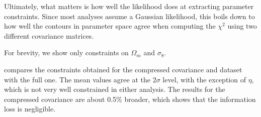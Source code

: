 \documentclass[twocolumn]{\docclass}
\begin{document}
	Ultimately, what matters is how well the likelihood does at extracting parameter constraints. Since most analyses assume a Gaussian likelihood, this boils down to how well the contours in parameter space agree when computing the $\chi^2$ using two different covariance matrices.
	
	For brevity, we show only constraints on $\Omega_m$ and $\sigma_8$.
	
	
	
	
	
		
	
	
	
	
	 compares the constraints obtained for the compressed covariance and dataset with the full one. The mean values agree at the $2 \sigma$ level, with the exception of $\eta$, which is not very well constrained in either analysis. The results for the compressed covariance are about 0.5\% broader, which shows that the information loss is negligible. 
	
\end{document}
